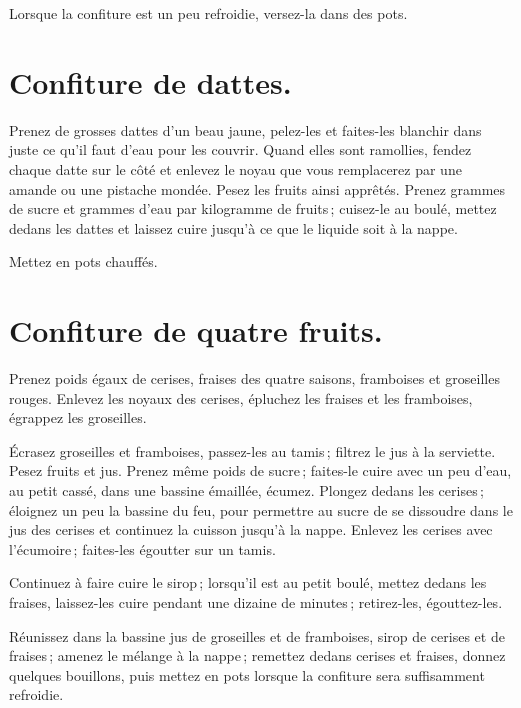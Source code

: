 Lorsque la confiture est un peu refroidie, versez-la dans des pots.

\section*{\centering Confiture de dattes.}
{}

Prenez de grosses dattes d'un beau jaune, pelez-les et faites-les blanchir dans
juste ce qu'il faut d'eau pour les couvrir. Quand elles sont ramollies, fendez
chaque datte sur le côté et enlevez le noyau que vous remplacerez par une
amande ou une pistache mondée. Pesez les fruits ainsi apprêtés. Prenez
{\mmm} grammes de sucre et {\mmm} grammes d'eau par kilogramme de
fruits ; cuisez-le au boulé, mettez dedans les dattes et laissez cuire jusqu'à
ce que le liquide soit à la nappe.

Mettez en pots chauffés.

\section*{\centering Confiture de quatre fruits.}
{}

Prenez poids égaux de cerises, fraises des quatre saisons, framboises et groseilles
rouges. Enlevez les noyaux des cerises, épluchez les fraises et les framboises,
égrappez les groseilles.

Écrasez groseilles et framboises, passez-les au tamis ; filtrez le jus à la
serviette. Pesez fruits et jus. Prenez même poids de sucre ; faites-le cuire
avec un peu d'eau, au petit cassé, dans une bassine émaillée, écumez. Plongez
dedans les cerises ; éloignez un peu la bassine du feu, pour permettre au sucre
de se dissoudre dans le jus des cerises et continuez la cuisson jusqu'à la
nappe. Enlevez les cerises avec l'écumoire ; faites-les égoutter sur un tamis.

Continuez à faire cuire le sirop ; lorsqu'il est au petit boulé, mettez dedans
les fraises, laissez-les cuire pendant une dizaine de minutes ; retirez-les,
égouttez-les.

Réunissez dans la bassine jus de groseilles et de framboises, sirop de cerises
et de fraises ; amenez le mélange à la nappe ; remettez dedans cerises et
fraises, donnez quelques bouillons, puis mettez en pots lorsque la confiture
sera suffisamment refroidie.

